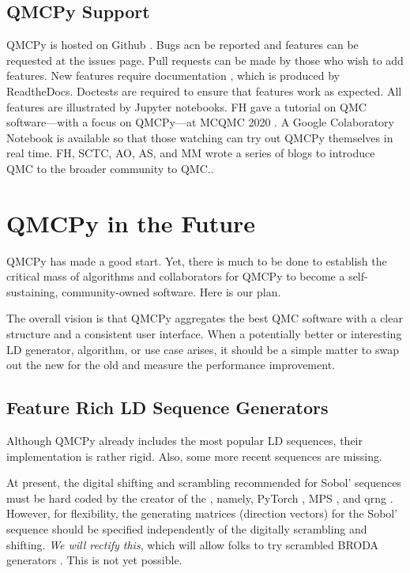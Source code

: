 \documentclass[11pt]{NSFamsart}
\begin{document}
\subsection{QMCPy Support}
QMCPy is hosted on Github \cite{QMCPy2020a}. Bugs acn be reported and features can be requested at the issues page.  Pull requests can be made by those who wish to add features.  New features require documentation \cite{QMCPyDocs}, which is  produced by ReadtheDocs.  Doctests are required to ensure that features work as expected. All features are illustrated by Jupyter notebooks.  FH gave a tutorial on QMC software---with a focus on QMCPy---at MCQMC 2020 \cite{MCQMC2020QMCPyTut}.  A Google Colaboratory Notebook \cite{QMCPyTutColab2020} is available so that those watching  can try out QMCPy themselves in real time.  FH, SCTC, AO, AS, and MM wrote a series of blogs \cite{QMCBlog} to introduce QMC to the broader community to QMC..

\section{QMCPy in the Future}
QMCPy has made a good start.  Yet, there is much to be done to establish the critical mass of algorithms and collaborators for QMCPy to become a self-sustaining, community-owned software.  Here is our plan.

The overall vision is that QMCPy aggregates the best QMC software with a clear structure and a consistent user interface.  When a potentially better or interesting LD generator, algorithm, or use case arises, it should be a simple matter to swap out the new for the old and measure the performance improvement.

\subsection{Feature Rich LD Sequence Generators} \label{sec:richLD}
Although QMCPy already includes the most popular LD sequences, their implementation is rather rigid.  Also, some more recent sequences are missing.

At present, the digital shifting and scrambling recommended for Sobol' sequences must be hard coded by the creator of the , namely, PyTorch \cite{PyTorch}, MPS \cite{Nuy17a}, and qrng \cite{QRNG2020}.  However, for flexibility, the generating matrices (direction vectors) for the Sobol' sequence should be specified independently of the digitally scrambling and shifting.  \emph{We will rectify this}, which will allow folks to try scrambled BRODA generators \cite{BRODA20a}.  This is not yet possible.
\end{document}
